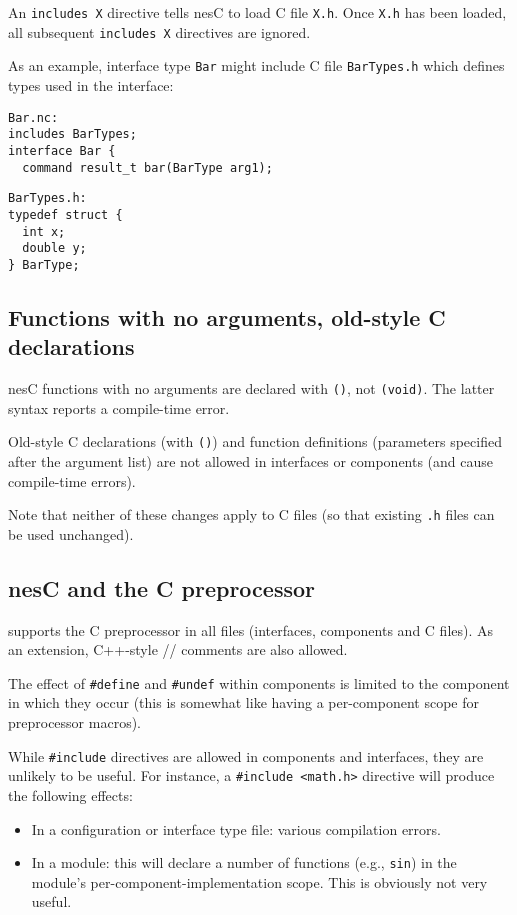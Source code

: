 \documentclass[11pt]{article}
\newcommand{\kw}[1]{{\tt #1}}
\newcommand{\code}[1]{{\tt #1}}
\newcommand{\file}[1]{{\tt #1}}
\newcommand{\nesc}{nesC\xspace}
\begin{document}
An \code{includes X} directive tells \nesc to load C file \file{X.h}. Once
\file{X.h} has been loaded, all subsequent \code{includes X} directives
are ignored.

As an example, interface type \code{Bar} might include C file
\file{BarTypes.h} which defines types used in the interface:

\begin{minipage}[t]{3in}
\begin{verbatim}
Bar.nc:
includes BarTypes;
interface Bar {
  command result_t bar(BarType arg1);
\end{verbatim}
\end{minipage}
\begin{minipage}[t]{3in}
\begin{verbatim}
BarTypes.h:
typedef struct {
  int x;
  double y;
} BarType;
\end{verbatim}
\end{minipage}

\subsection{Functions with no arguments, old-style C declarations}

\nesc functions with no arguments are declared with \code{()}, not
\code{(void)}. The latter syntax reports a compile-time error.

Old-style C declarations (with \code{()}) and function definitions 
(parameters specified after the argument list) are not allowed in
interfaces or components (and cause compile-time errors).

Note that neither of these changes apply to C files (so that existing
\file{.h} files can be used unchanged).

\subsection{\nesc and the C preprocessor}

\nesC supports the C preprocessor in all files (interfaces, components and
C files). As an extension, C++-style // comments are also allowed.

The effect of \kw{\#define} and \kw{\#undef} within components is
limited to the component in which they occur (this is somewhat like
having a per-component scope for preprocessor macros).

While \kw{\#include} directives are allowed in components and interfaces,
they are unlikely to be useful. For instance, a \code{\#include <math.h>}
directive will produce the following effects:
\begin{itemize}
\item In a configuration or interface type file: various compilation errors.
\item In a module: this will declare a number of functions (e.g., \code{sin})
in the module's per-component-implementation scope. This is obviously
not very useful.
\end{itemize}
\end{document}
